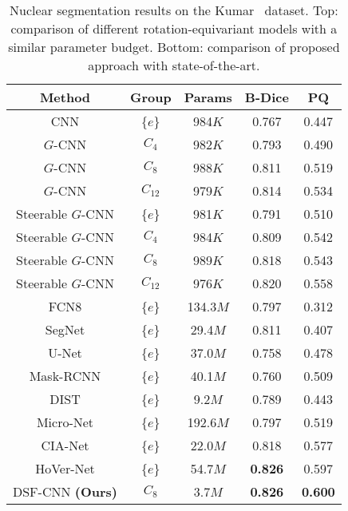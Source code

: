 \documentclass[journal]{IEEEtran}
\begin{document}
	

	\newcommand{\STAB}[1]{\begin{tabular}{@{}c@{}}#1\end{tabular}}
	\begin{table}[h]
		\begin{center}
			\caption{Nuclear segmentation results on the Kumar~\cite{kumar2017dataset} dataset. Top: comparison of different rotation-equivariant models with a similar parameter budget. Bottom: comparison of proposed approach with state-of-the-art.}
			\label{dup1 table:comparative_kumar}
			\setlength{\tabcolsep}{2pt} \renewcommand{\arraystretch}{1} \begin{tabular}{c|c|c|c|c}
 					     \textbf{Method}
						 & \textbf{Group} & \textbf{Params}
						 & \textbf{B-Dice} & \textbf{PQ} \\
					\midrule
					
					
CNN  & \{$e$\} & 984$K$ & 0.767 &     0.447 \\ 
					$G$-CNN \cite{cohen2016group} & $C_4$ & 982$K$ & 0.793  & 0.490  \\ 
					$G$-CNN \cite{bekkers2018roto,lafarge2020roto} & $C_{8}$ & 988$K$ &  0.811 &  0.519 \\ 
					$G$-CNN \cite{bekkers2018roto,lafarge2020roto} & $C_{12}$ & 979$K$ &  0.814 & 0.534 \\ 
					Steerable $G$-CNN \cite{weiler2018learning} & \{$e$\} & 981$K$ & 0.791  & 0.510 \\ 
					Steerable $G$-CNN \cite{weiler2018learning} & $C_{4}$ & 984$K$ & 0.809  & 0.542 \\ 
					Steerable $G$-CNN \cite{weiler2018learning} & $C_{8}$ & 989$K$ & 0.818  & 0.543 \\ 
					Steerable $G$-CNN \cite{weiler2018learning} & $C_{12}$ & 976$K$ & 0.820  & 0.558 \\
					\midrule
					FCN8 \cite{long2015fully} & \{$e$\} & 134.3$M$ &  0.797  & 0.312 \\
					SegNet \cite{badrinarayanan2017segnet} & \{$e$\} & 29.4$M$ &  0.811 & 0.407 \\ 
					U-Net \cite{ronneberger2015u} & \{$e$\}  & 37.0$M$ &  0.758 & 0.478  \\ 
					Mask-RCNN \cite{mrcnn} & \{$e$\} & 40.1$M$ &  0.760  & 0.509 \\ 
					DIST \cite{naylor2018segmentation} & \{$e$\} & 9.2$M$ & 0.789  &  0.443 \\ 
					Micro-Net \cite{raza2019micro} & \{$e$\} & 192.6$M$ &  0.797  & 0.519  \\
					CIA-Net \cite{zhou2019cia} & \{$e$\} & 22.0$M$ &  0.818   & 0.577  \\ 
					HoVer-Net \cite{graham2019hover} & \{$e$\}  & 54.7$M$ &  \textbf{0.826}   & 0.597 \\
					DSF-CNN \textbf{(Ours)} & $C_8$  & 3.7$M$ &  \textbf{0.826}  & \textbf{0.600}   \\
					\bottomrule
				\end{tabular}
		
		\end{center}
	\end{table}
	    
\end{document}
